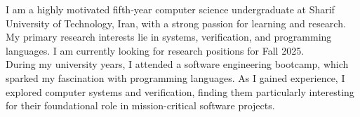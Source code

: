 

\begin{cvparagraph}
I am a highly motivated fifth‑year computer science undergraduate at Sharif University of Technology, Iran, with a
strong passion for learning and research. \\
My primary research interests lie in systems, verification, and programming
languages. I am currently looking for research positions for Fall 2025. \\
During my university years, I attended a software engineering bootcamp, which
sparked my fascination with programming languages.
As I gained experience, I explored computer systems and verification,
finding them particularly interesting for their foundational role in
mission-critical
software projects.
\end{cvparagraph}

